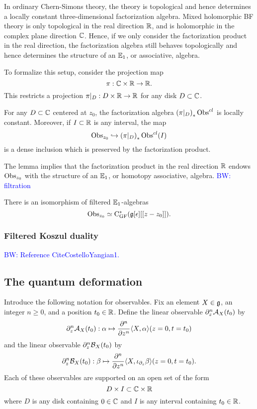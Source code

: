 \documentclass[11pt]{amsart}
\numberwithin{equation}{section}
\def\brian{\textcolor{blue}{BW: }\textcolor{blue}}
\def\GF{{\rm GF}}
\begin{document}
In ordinary Chern-Simons theory, the theory is topological and hence determines a locally constant three-dimensional factorization algebra. 
Mixed holomorphic BF theory is only topological in the real direction $\mathbb R$, and is holomorphic in the complex plane direction $\mathbb C$. 
Hence, if we only consider the factorization product in the real direction, the factorization algebra still behaves topologically and hence determines the structure of an $\mathbb E_1$, or associative, algebra. 

To formalize this setup, consider the projection map 
\[
\pi : \mathbb C \times \mathbb R \to \mathbb R .
\]
This restricts a projection $\pi |_{D} : D \times \mathbb R \to \mathbb R$ for any disk $D \subset \mathbb C$. 

\begin{lem}
For any $D \subset \mathbb C$ centered at $z_0$, the factorization algebra $\left(\pi |_D\right)_*{\rm Obs}^{cl}$ is locally constant. 
Moreover, if $I \subset \mathbb R$ is any interval, the map
\[
{\rm Obs}_{z_0} \hookrightarrow \left(\pi |_D\right)_*{\rm Obs}^{cl} (I) 
\]
is a dense inclusion which is preserved by the factorization product. 
\end{lem}

The lemma implies that the factorization product in the real direction $\mathbb R$ endows ${\rm Obs}_{z_0}$ with the structure of an $\mathbb E_1$, or homotopy associative, algebra. 
\brian{filtration}

\begin{prop}
There is an isomorphism of filtered $\mathbb E_1$-algebras 
\[
\Obs_{z_0} \simeq {\rm C}^*_{\GF}(\fg[\epsilon][[z-z_0]]) .
\]
\end{prop}

\subsubsection{Filtered Koszul duality}

\brian{Reference {\rm C}ite{CostelloYangian1}.}


\subsection{The quantum deformation}

Introduce the following notation for observables. 
Fix an element $X \in \mathfrak g$, an integer $n \geq 0$, and a position $t_0 \in \mathbb R$. 
Define the linear observable $\partial_z^n \mathcal A_X (t_0)$ by
\[
\partial_z^n \mathcal A_X (t_0) : \alpha \mapsto \frac{\partial^n}{\partial z^n} \langle X, \alpha\rangle(z = 0, t = t_0) 
\]
and the linear observable $\partial_z^n \mathcal B_X (t_0)$ by
\[
\partial_z^n \mathcal B_X (t_0) : \beta \mapsto \frac{\partial^n}{\partial z^n} \langle X, \iota_{\partial_z} \beta\rangle(z = 0, t = t_0) .
\]
Each of these observables are supported on an open set of the form
\[
D \times I \subset \mathbb C \times \mathbb R
\]
where $D$ is any disk containing $0 \in \mathbb C$ and $I$ is any interval containing $t_0 \in \mathbb R$. 
\end{document}
